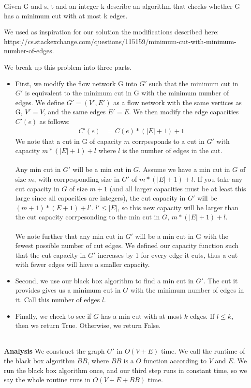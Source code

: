\documentclass[11pt]{article}
\begin{document}
\item Given G and s, t and an integer k describe an algorithm that checks whether G has a minimum cut with at most k edges.
\begin{solution} We used as inspiration for our solution the modifications described here: \\ https://cs.stackexchange.com/questions/115159/minimum-cut-with-minimum-number-of-edges. 

We break up this problem into three parts. 

\begin{itemize} 
\item First, we modify the flow network G into $G'$ such that the minimum cut in $G'$ is equivalent to the minimum cut in G with the minimum number of edges. We define $G'=(V', E')$ as a flow network with the same vertices as G, $V'=V$, and the same edges $E'=E$. We then modify the edge capacities $C'(e)$ as follows: 
\begin{align*}
C'(e) &= C(e)*(|E|+1) + 1  
\end{align*}
We note that a cut in G of capacity $m$ corrpesponds to a cut in $G'$ with capacity $m*(|E|+1)+l$ where $l$ is the number of edges in the cut. \\ \\
Any min cut in $G'$ will be a min cut in $G$. Assume we have a min cut in $G$ of size $m$, with corrpesponding size in $G'$ of $m*(|E|+1)+l$. If you take any cut capacity in $G$ of size $m+1$ (and all larger capacities must be at least this large since all capacities are integers), the cut capacity in $G'$ will be $(m+1)*(E+1)+l'$. $l'\leq |E|$, so this new capacity will be larger than the cut capacity corrpesonding to the min cut in $G$, $m*(|E|+1)+l$. \\ \\
We note further that any min cut in $G'$ will be a min cut in G with the fewest possible number of cut edges. We defined our capacity function such that the cut capacity in $G'$ increases by 1 for every edge it cuts, thus a cut with fewer edges will have a smaller capacity. \\

\item Second, we use our black box algorithm to find a min cut in $G'$. The cut it provides gives us a minimum cut in $G$ with the minimum number of edges in it. Call this number of edges $l$. \\

\item Finally, we check to see if $G$ has a min cut with at most $k$ edges. If $l\leq k$, then we return True. Otherwise, we return False.

\end{itemize}
\\
\textbf{Analysis} We construct the graph $G'$ in $O(V+E)$ time. We call the runtime of the black box algorithm $BB$, where $BB$ is a $O$ function according to $V$ and $E$. We run the black box algorithm once, and our third step runs in constant time, so we say the whole routine runs in $O(V+E+BB)$ time.

\end{solution}
\end{document}
